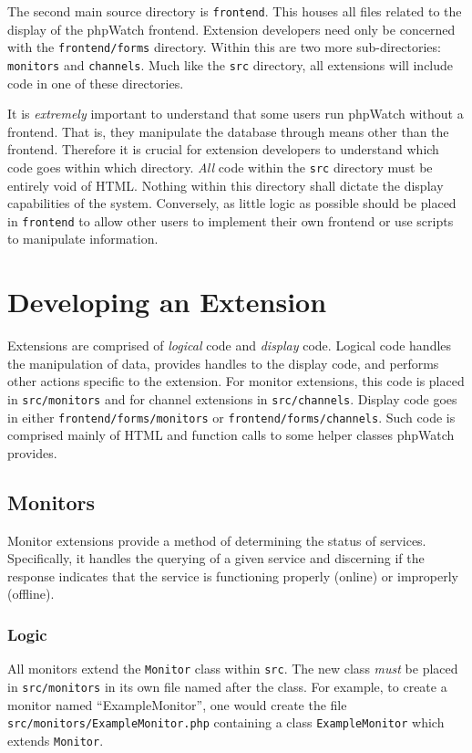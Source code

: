 \documentclass[10pt]{article}
\begin{document}
The second main source directory is \texttt{frontend}.  This houses all files related to the display of the phpWatch
frontend.  Extension developers need only be concerned with the \texttt{frontend/forms} directory.  Within this are two
more sub-directories: \texttt{monitors} and \texttt{channels}.  Much like the \texttt{src} directory, all extensions will
include code in one of these directories.

It is \emph{extremely} important to understand that some users run phpWatch without a frontend.  That is, they
manipulate the database through means other than the frontend.  Therefore it is crucial for extension developers to
understand which code goes within which directory.  \emph{All} code within the \texttt{src} directory must be entirely
void of HTML.  Nothing within this directory shall dictate the display capabilities of the system.  Conversely, as
little logic as possible should be placed in \texttt{frontend} to allow other users to implement their own frontend or
use scripts to manipulate information.

\section{Developing an Extension}
Extensions are comprised of \emph{logical} code and \emph{display} code.  Logical code handles the manipulation of data,
provides handles to the display code, and performs other actions specific to the extension.  For monitor extensions,
this code is placed in \texttt{src/monitors} and for channel extensions in \texttt{src/channels}.  Display code goes in
either \texttt{frontend/forms/monitors} or \texttt{frontend/forms/channels}.  Such code is comprised mainly of HTML and
function calls to some helper classes phpWatch provides.

\subsection{Monitors}
Monitor extensions provide a method of determining the status of services.  Specifically, it handles the querying of a
given service and discerning if the response indicates that the service is functioning properly (online) or improperly
(offline).

\subsubsection{Logic}
All monitors extend the \texttt{Monitor} class within \texttt{src}.  The new class \emph{must} be placed in
\texttt{src/monitors} in its own file named after the class.  For example, to create a monitor named ``ExampleMonitor'',
one would create the file \texttt{src/monitors/ExampleMonitor.php} containing a class \texttt{ExampleMonitor} which
extends \texttt{Monitor}.
 
\end{document}
